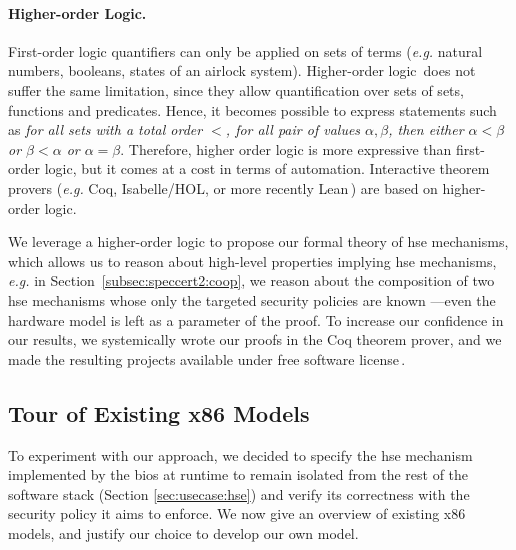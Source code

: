 \paragraph{Higher-order Logic.}
%
First-order logic quantifiers can only be applied on sets of terms (\emph{e.g.}
natural numbers, booleans, states of an airlock system).
%
Higher-order logic\,\cite{leivant1994hol} does not suffer the same limitation,
since they allow quantification over sets of sets, functions and predicates.
%
Hence, it becomes possible to express statements such as \emph{for all sets with
  a total order \( < \), for all pair of values \( \alpha, \beta \), then either
  \( \alpha < \beta \) or \( \beta < \alpha \) or \( \alpha = \beta \)}.
%
Therefore, higher order logic is more expressive than first-order logic, but it
comes at a cost in terms of automation.
%
Interactive theorem provers (\emph{e.g.}  Coq, Isabelle/HOL, or more recently
Lean\,\cite{de2015lean}) are based on higher-order logic.

We leverage a higher-order logic to propose our formal theory of \ac{hse}
mechanisms, which allows us to reason about high-level properties implying
\ac{hse} mechanisms, \emph{e.g.} in Section~\ref{subsec:speccert2:coop}, we
reason about the composition of two \ac{hse} mechanisms whose only the targeted
security policies are known ---even the hardware model is left as a parameter of
the proof.
%
To increase our confidence in our results, we systemically wrote our proofs in
the Coq theorem prover, and we made the resulting projects available under free
software license\,\cite{letan2016speccertcode,letan2018freespeccode}.

\subsection{Tour of Existing x86 Models}
\label{subsec:sota:ltsrelated}

To experiment with our approach, we decided to specify the \ac{hse} mechanism
implemented by the \ac{bios} at runtime to remain isolated from the rest of the
software stack (Section \ref{sec:usecase:hse}) and verify its correctness with
the security policy it aims to enforce.
%
We now give an overview of existing x86 models, and justify our choice to
develop our own model.

